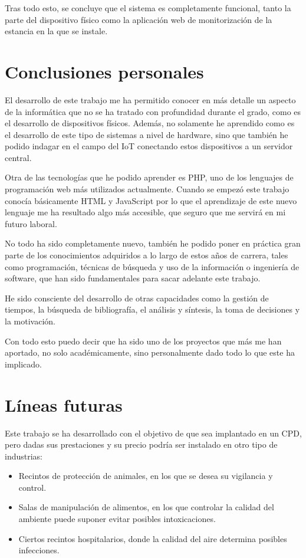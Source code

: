 Tras todo esto, se concluye que el sistema es completamente funcional, tanto la parte del dispositivo físico como la aplicación web de monitorización de la estancia en la que se instale.

\section{Conclusiones personales}\label{sec:conclusiones-personales}
El desarrollo de este trabajo me ha permitido conocer en más detalle un aspecto de la informática que no se ha tratado con profundidad durante el grado, como es el desarrollo de dispositivos físicos. Además, no solamente he aprendido como es el desarrollo de este tipo de sistemas a nivel de hardware, sino que también he podido indagar en el campo del IoT conectando estos dispositivos a un servidor central.

Otra de las tecnologías que he podido aprender es PHP, uno de los lenguajes de programación web más utilizados actualmente. Cuando se empezó este trabajo conocía básicamente HTML y JavaScript por lo que el aprendizaje de este nuevo lenguaje me ha resultado algo más accesible, que seguro que me servirá en mi futuro laboral.

No todo ha sido completamente nuevo, también he podido poner en práctica gran parte de los conocimientos adquiridos a lo largo de estos años de carrera, tales como programación, técnicas de búsqueda y uso de la información o ingeniería de software, que han sido fundamentales para sacar adelante este trabajo.

He sido consciente del desarrollo de otras capacidades como la gestión de tiempos, la búsqueda de bibliografía, el análisis y síntesis, la toma de decisiones y la motivación.

Con todo esto puedo decir que ha sido uno de los proyectos que más me han aportado, no solo académicamente, sino personalmente dado todo lo que este ha implicado.

\section{Líneas futuras}\label{sec:líneas-futuras}
Este trabajo se ha desarrollado con el objetivo de que sea implantado en un CPD, pero dadas sus prestaciones y su precio podría ser instalado en otro tipo de industrias:
\begin{itemize}
    \item Recintos de protección de animales, en los que se desea su vigilancia y control.
    \item Salas de manipulación de alimentos, en los que controlar la calidad del ambiente puede suponer evitar posibles  intoxicaciones.
    \item Ciertos recintos hospitalarios, donde la calidad del aire determina posibles infecciones.
\end{itemize}

